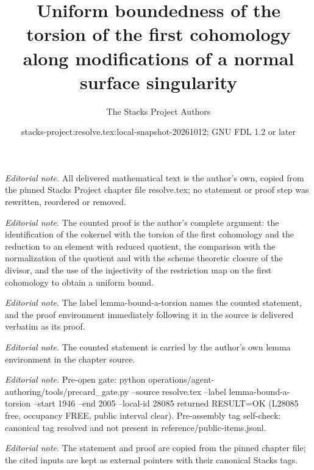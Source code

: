 \documentclass[10pt,a4paper]{amsart}
\title{Uniform boundedness of the torsion of the first cohomology along modifications of a normal surface singularity}
\author{The Stacks Project Authors}
\date{stacks-project:resolve.tex:local-snapshot-20261012; GNU FDL 1.2 or later}
\theoremstyle{plain}
\theoremstyle{definition}
\theoremstyle{remark}
\numberwithin{equation}{subsection}
\begin{document}
\maketitle
\noindent\textit{Editorial note.} All delivered mathematical text is the author's own, copied from the pinned Stacks Project chapter file resolve.tex; no statement or proof step was rewritten, reordered or removed.\par\medskip
\noindent\textit{Editorial note.} The counted proof is the author's complete argument: the identification of the cokernel with the torsion of the first cohomology and the reduction to an element with reduced quotient, the comparison with the normalization of the quotient and with the scheme theoretic closure of the divisor, and the use of the injectivity of the restriction map on the first cohomology to obtain a uniform bound.\par\medskip
\noindent\textit{Editorial note.} The label lemma-bound-a-torsion names the counted statement, and the proof environment immediately following it in the source is delivered verbatim as its proof.\par\medskip
\noindent\textit{Editorial note.} The counted statement is carried by the author's own lemma environment in the chapter source.\par\medskip
\noindent\textit{Editorial note.} Pre-open gate: python operations/agent-authoring/tools/precard\_gate.py --source resolve.tex --label lemma-bound-a-torsion --start 1946 --end 2005 --local-id 28085 returned RESULT=OK (L28085 free, occupancy FREE, public interval clear). Pre-assembly tag self-check: canonical tag resolved and not present in reference/public-items.jsonl.\par\medskip
\noindent\textit{Editorial note.} The statement and proof are copied from the pinned chapter file; the cited inputs are kept as external pointers with their canonical Stacks tags.\par\medskip
\end{document}

